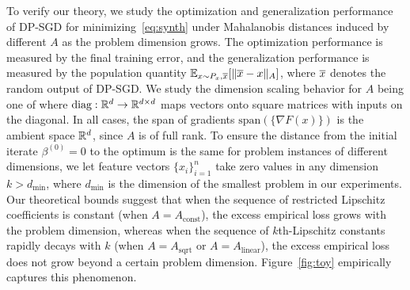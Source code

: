 To verify our theory, we study the optimization and generalization performance of DP-SGD for minimizing~\eqref{eq:synth} under Mahalanobis distances induced by different $A$ as the problem dimension grows. 
The optimization performance is measured by the final training error, and the generalization performance is measured by the population quantity $\mathbb{E}_{x \sim P_x, \overline{x}} [ \| \overline{x} - x \|_A ]$, where $\overline{x}$ denotes the random output of DP-SGD.
We study the dimension scaling behavior for $A$ being one of 
where $\text{diag}: \mathbb{R}^d \to \mathbb{R}^{d \times d}$ maps vectors onto square matrices with inputs on the diagonal.
In all cases, the span of gradients $\text{span}( \{ \nabla F(x) \} )$ is the ambient space $\mathbb{R}^d$, since $A$ is of full rank.
To ensure the distance from the initial iterate $\beta^{(0)} = 0$ to the optimum is the same for problem instances of different dimensions, we let feature vectors $\{x_i\}_{i=1}^n$ take zero values in any dimension $k > d_{\text{min}}$, where $d_{\text{min}}$ is the dimension of the smallest problem in our experiments.
Our theoretical bounds suggest that when the sequence of restricted Lipschitz coefficients is constant (when $A = A_{\text{const}}$), the excess empirical loss grows with the problem dimension, whereas when the sequence of $k$th-Lipschitz constants rapidly decays with $k$ (when $A = A_{\text{sqrt}}$ or $A = A_{\text{linear}}$), the excess empirical loss does not grow beyond a certain problem dimension. 
Figure~\ref{fig:toy} empirically captures this phenomenon. 
